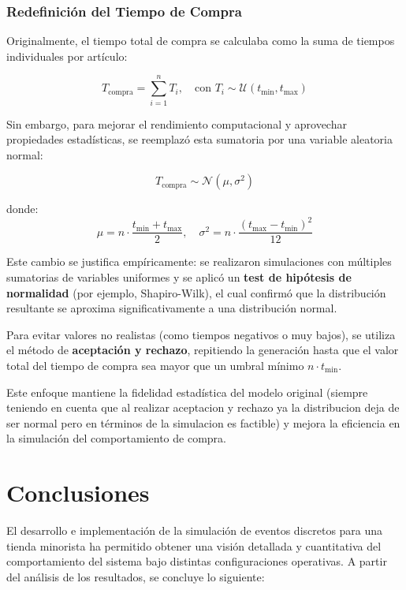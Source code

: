 \documentclass[12pt, a4paper]{article}
\begin{document}
\subsubsection{Redefinición del Tiempo de Compra}

Originalmente, el tiempo total de compra se calculaba como la suma de tiempos individuales por artículo:

\[
T_{\text{compra}} = \sum_{i=1}^{n} T_i, \quad \text{con } T_i \sim \mathcal{U}(t_{\text{min}}, t_{\text{max}})
\]

Sin embargo, para mejorar el rendimiento computacional y aprovechar propiedades estadísticas, se reemplazó esta sumatoria por una variable aleatoria normal:

\[
T_{\text{compra}} \sim \mathcal{N}(\mu, \sigma^2)
\]

donde:
\[
\mu = n \cdot \frac{t_{\text{min}} + t_{\text{max}}}{2}, \quad 
\sigma^2 = n \cdot \frac{(t_{\text{max}} - t_{\text{min}})^2}{12}
\]

Este cambio se justifica empíricamente: se realizaron simulaciones con múltiples sumatorias de variables uniformes y se aplicó un \textbf{test de hipótesis de normalidad} (por ejemplo, Shapiro-Wilk), el cual confirmó que la distribución resultante se aproxima significativamente a una distribución normal.

Para evitar valores no realistas (como tiempos negativos o muy bajos), se utiliza el método de \textbf{aceptación y rechazo}, repitiendo la generación hasta que el valor total del tiempo de compra sea mayor que un umbral mínimo $n \cdot t_{\text{min}}$.

Este enfoque mantiene la fidelidad estadística del modelo original (siempre teniendo en cuenta que al realizar aceptacion y rechazo ya la distribucion deja de ser normal pero en términos de la simulacion es factible) y mejora la eficiencia en la simulación del comportamiento de compra.

\section{Conclusiones}

El desarrollo e implementación de la simulación de eventos discretos para una tienda minorista ha permitido obtener una visión detallada y cuantitativa del comportamiento del sistema bajo distintas configuraciones operativas. A partir del análisis de los resultados, se concluye lo siguiente:
\end{document}
